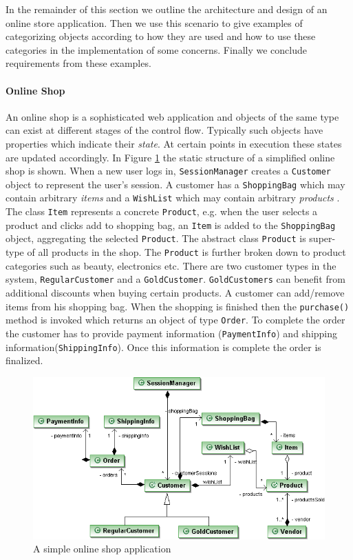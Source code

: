 \documentclass{llncs}
\begin{document}
In the remainder of this section we outline the architecture and design of an online store application. Then we use this scenario to give examples of categorizing objects according to how they are used and how to use these categories in the implementation of some concerns. Finally we conclude requirements from these examples.
\paragraph{Online Shop}
An online shop is a sophisticated web application and objects of the same type can exist at different stages of the control flow. Typically such objects have properties which indicate their \emph{state}. At certain points in execution these states are updated  accordingly. In Figure \ref{fig:shop} the static structure of a simplified online shop is shown. When a new user logs in, \texttt{SessionManager} creates a \texttt{Customer} object to represent the user's session. A customer has a \texttt{ShoppingBag} which may contain arbitrary \emph{items} and a \texttt{WishList} which may contain arbitrary \emph{products} . The class \texttt{Item} represents a concrete \texttt{Product}, e.g. when the user selects a product and clicks add to shopping bag, an \texttt{Item} is added to the \texttt{ShoppingBag} object, aggregating the selected \texttt{Product}. The abstract class \texttt{Product} is super-type of all products in the shop. The \texttt{Product} is further broken down to product categories such as beauty, electronics etc. There are two customer types in the system, \texttt{RegularCustomer} and a \texttt{GoldCustomer}. \texttt{GoldCustomers} can benefit from additional discounts when buying certain products. A customer can add/remove items from his shopping bag. When the shopping is finished then the \texttt{purchase()} method is invoked which returns an object of type \texttt{Order}. To complete the order the customer has to provide payment information (\texttt{PaymentInfo}) and shipping information(\texttt{ShippingInfo}). Once this information is complete the order is finalized. 

\begin{figure}[b]
\includegraphics[width=\textwidth]{images/onlineshop_son.png}%
\caption{A simple online shop application}%
\label{fig:shop}%
\end{figure}
\end{document}
